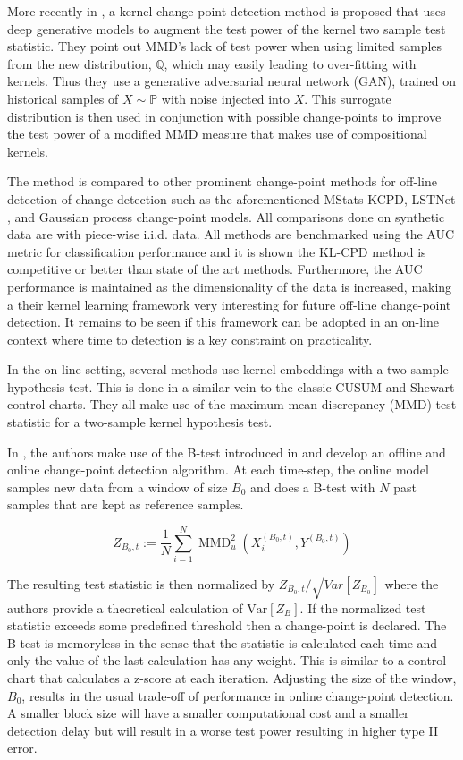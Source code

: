 More recently in \cite{chang2019kernel}, a  kernel change-point detection method is proposed that uses deep generative models to augment the test power of the kernel two sample test statistic. They point out MMD's lack of test power when using limited samples from the new distribution, $\mathbb{Q}$, which may easily leading to over-fitting with kernels. Thus they use a generative adversarial neural network (GAN), trained on historical samples of $X \sim  \mathbb{P}$  with noise injected into $X$. This surrogate distribution is then used in conjunction with possible change-points to improve the test power of a modified MMD measure that makes use of compositional kernels.

The method is compared to other prominent change-point methods for off-line detection of change detection such as the aforementioned MStats-KCPD, LSTNet , and Gaussian process change-point models. All comparisons done on synthetic data are with piece-wise i.i.d. data. All methods are benchmarked using the AUC metric for classification performance and it is shown the KL-CPD method is competitive or better than state of the art methods.  Furthermore, the AUC performance is maintained as the dimensionality of the data is increased, making a their kernel learning framework very interesting for future off-line change-point detection. It remains to be seen if this framework can be adopted in an on-line context where time to detection is a key constraint on practicality.

In the on-line setting, several methods use kernel embeddings with a two-sample hypothesis test. This is done in a similar vein to the classic CUSUM and Shewart control charts. They all make use of the maximum mean discrepancy (MMD) test statistic for a two-sample kernel hypothesis test. 

In  \cite{li2015m}, the authors make use of the B-test introduced in \cite{zaremba2013b} and develop an offline and online change-point detection algorithm. At each time-step, the online model samples new data from a window of size $B_0$ and does a B-test with $N$ past samples that are kept as reference samples. 

$$Z_{B_{0}, t}:=\frac{1}{N} \sum_{i=1}^{N} \operatorname{MMD}_{u}^{2}\left(X_{i}^{\left(B_{0}, t\right)}, Y^{\left(B_{0}, t\right)}\right)$$

The resulting test statistic is then normalized by $Z_{B_{0}, t}/\sqrt{Var[Z_{B_0}]}$ where the authors provide a theoretical calculation of $\text{Var}[Z_B]$. If the normalized test statistic exceeds some predefined threshold then a change-point is declared. The B-test is memoryless in the sense that the statistic is calculated each time and only the value of the last calculation has any weight. This is similar to a control chart that calculates a z-score at each iteration. Adjusting the size of the window, $B_0$, results in the usual trade-off of performance in online change-point detection. A smaller block size will have a smaller computational cost and a smaller detection delay but will result in a worse test power resulting in higher type II error.


